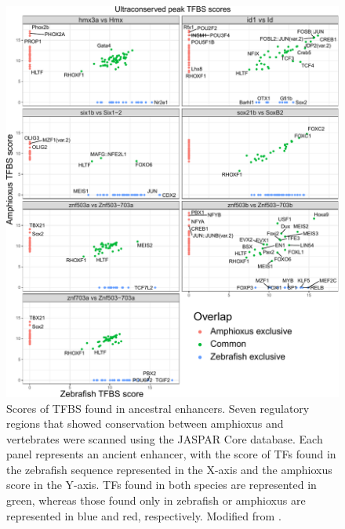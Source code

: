 \begin{figure}[hp]
\centering
\includegraphics[width=1\textwidth]{Figures/Ultraconserved_TFBS}
\caption[Ultraconserved TFBS]{Scores of TFBS found in ancestral enhancers. Seven regulatory regions that showed conservation between amphioxus and vertebrates were scanned using the JASPAR Core database. Each panel represents an ancient enhancer, with the score of TFs found in the zebrafish sequence represented in the X-axis and the amphioxus score in the Y-axis. TFs found in both species are represented in green, whereas those found only in zebrafish or amphioxus are represented in blue and red, respectively. Modified from \parencite{gil-galvez_gain_2022}.}
\label{fig:Ultraconserved_TFBS}
\end{figure} 


